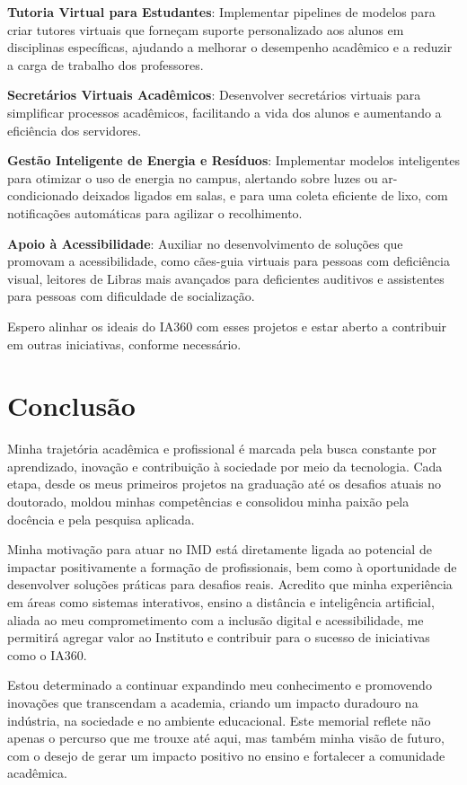 \documentclass[10pt,a4paper,oneside]{book}
\begin{document}
\textbf{Tutoria Virtual para Estudantes}: Implementar pipelines de modelos para criar tutores virtuais que forneçam
suporte personalizado aos alunos em disciplinas específicas, ajudando a melhorar o desempenho acadêmico e a reduzir
a carga de trabalho dos professores.

\textbf{Secretários Virtuais Acadêmicos}: Desenvolver secretários virtuais para simplificar processos acadêmicos,
facilitando a vida dos alunos e aumentando a eficiência dos servidores.

\textbf{Gestão Inteligente de Energia e Resíduos}: Implementar modelos inteligentes para otimizar o uso de energia no
campus, alertando sobre luzes ou ar-condicionado deixados ligados em salas, e para uma coleta eficiente de lixo, com
notificações automáticas para agilizar o recolhimento.

\textbf{Apoio à Acessibilidade}: Auxiliar no desenvolvimento de soluções que promovam a acessibilidade, como cães-guia
virtuais para pessoas com deficiência visual, leitores de Libras mais avançados para deficientes auditivos e assistentes
para pessoas com dificuldade de socialização.

Espero alinhar os ideais do IA360 com esses projetos e estar aberto a contribuir em outras iniciativas, conforme necessário.




\chapter{Conclusão}
\label{cap_conclusao}

Minha trajetória acadêmica e profissional é marcada pela busca constante por aprendizado, inovação e contribuição à
sociedade por meio da tecnologia. Cada etapa, desde os meus primeiros projetos na graduação até os desafios atuais no
doutorado, moldou minhas competências e consolidou minha paixão pela docência e pela pesquisa aplicada.

Minha motivação para atuar no IMD está diretamente ligada ao potencial de impactar positivamente a formação de
profissionais, bem como à oportunidade de desenvolver soluções práticas para desafios reais. Acredito que minha
experiência em áreas como sistemas interativos, ensino a distância e inteligência artificial, aliada ao meu
comprometimento com a inclusão digital e acessibilidade, me permitirá agregar valor ao Instituto e contribuir para o
sucesso de iniciativas como o IA360.

Estou determinado a continuar expandindo meu conhecimento e promovendo inovações que transcendam a academia, criando
um impacto duradouro na indústria, na sociedade e no ambiente educacional. Este memorial reflete não apenas o percurso
que me trouxe até aqui, mas também minha visão de futuro, com o desejo de gerar um impacto positivo no ensino e
fortalecer a comunidade acadêmica.


\backmatter


\end{document}

